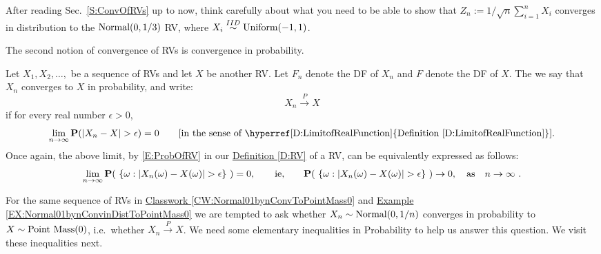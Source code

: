 \begin{Exercise}[title={Example Classwork},label={xExample}]
After reading Sec.~\ref{S:ConvOfRVs} up to now, think carefully about what you need to be able to show that $Z_n := 1/\sqrt{n}\sum_{i=1}^n X_i$ converges in distribution to the $\mbox{{\rm Normal}}(0,1/3)$ RV, where $X_i \overset{IID}{\sim} \mbox{{\rm Uniform}}(-1,1)$.
\end{Exercise}


The second notion of convergence of RVs is convergence in probability.

\begin{definition}\label{D:ConvInProb}
Let $X_1,X_2,\ldots,$ be a sequence of RVs and let $X$ be another RV.  Let $F_n$ denote the DF of $X_n$ and $F$ denote the DF of $X$.  The we say that $X_n$ converges to $X$ in probability, and write:
\[
X_n \overset{P}{\longrightarrow} X
\]
if for every real number $\epsilon > 0$,
\[
\lim_{n \rightarrow \infty} \p(|X_n-X|> \epsilon) = 0 \qquad \text{[in the sense of \hyperref[D:LimitofRealFunction]{Definition \ref*{D:LimitofRealFunction}}].}
\]
Once again, the above limit, by \eqref{E:ProbOfRV} in our \hyperref[D:RV]{Definition \ref*{D:RV}} of a RV, can be equivalently expressed as follows: 
\[
\lim_{n \rightarrow \infty} \mathbf{P}( \ \{\omega: |X_n(\omega) - X(\omega)| > \epsilon\} \ )=0, \qquad \text{ie,} \qquad \mathbf{P}( \ \{\omega: |X_n(\omega) - X(\omega)| > \epsilon\} \ ) \rightarrow 0, \quad \text{as} \quad n \rightarrow \infty \ .
\]
\end{definition}
 
For the same sequence of RVs in  \hyperref[CW:Normal01bynConvToPointMass0]{Classwork \ref*{CW:Normal01bynConvToPointMass0}} and \hyperref[EX:Normal01bynConvinDistToPointMass0]{Example \ref*{EX:Normal01bynConvinDistToPointMass0}} we are tempted to ask whether $X_n \sim \mbox{{\rm Normal}}(0,1/n)$ converges in probability to $X \sim \mbox{{\rm Point~Mass}}(0)$, i.e.~whether $X_n \overset{P}{\longrightarrow} X$.  We need some elementary inequalities in Probability to help us answer this question.  We visit these inequalities next.


